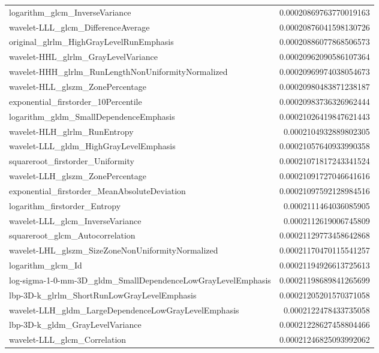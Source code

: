 {\begin{xltabular}[H]{\textwidth}{X r}
        logarithm\_glcm\_InverseVariance & 0.00020869763770019163 \\
        wavelet-LLL\_glcm\_DifferenceAverage & 0.00020876041598130726 \\
        original\_glrlm\_HighGrayLevelRunEmphasis & 0.00020886077868506573 \\
        wavelet-HHL\_glrlm\_GrayLevelVariance & 0.00020962090586107364 \\
        wavelet-HHH\_glrlm\_RunLengthNonUniformityNormalized & 0.00020969974038054673 \\
        wavelet-HLL\_glszm\_ZonePercentage & 0.00020980483871238187 \\
        exponential\_firstorder\_10Percentile & 0.00020983736326962444 \\
        logarithm\_gldm\_SmallDependenceEmphasis & 0.00021026419847621443 \\
        wavelet-HLH\_glrlm\_RunEntropy & 0.0002104932889802305 \\
        wavelet-LLL\_gldm\_HighGrayLevelEmphasis & 0.00021057640933990358 \\
        squareroot\_firstorder\_Uniformity & 0.00021071817243341524 \\
        wavelet-LLH\_glszm\_ZonePercentage & 0.00021091727046641616 \\
        exponential\_firstorder\_MeanAbsoluteDeviation & 0.00021097592128984516 \\
        logarithm\_firstorder\_Entropy & 0.0002111464036085905 \\
        wavelet-LLL\_glcm\_InverseVariance & 0.0002112619006745809 \\
        squareroot\_glcm\_Autocorrelation & 0.00021129773458642868 \\
        wavelet-LHL\_glszm\_SizeZoneNonUniformityNormalized & 0.00021170470115541257 \\
        logarithm\_glcm\_Id & 0.00021194926613725613 \\
        log-sigma-1-0-mm-3D\_gldm\_SmallDependenceLowGrayLevelEmphasis & 0.00021198689841265699 \\
        lbp-3D-k\_glrlm\_ShortRunLowGrayLevelEmphasis & 0.00021205201570371058 \\
        wavelet-LLH\_gldm\_LargeDependenceLowGrayLevelEmphasis & 0.0002122478433735058 \\
        lbp-3D-k\_gldm\_GrayLevelVariance & 0.00021228627458804466 \\
        wavelet-LLL\_glcm\_Correlation & 0.00021246825093992062 \\

\end{xltabular}}

